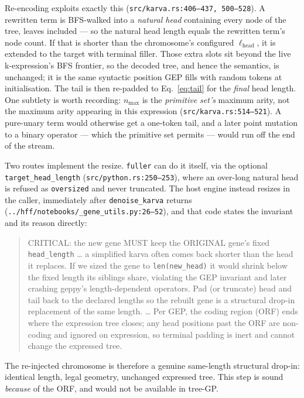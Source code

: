 \documentclass[sigconf]{acmart}
\begin{document}
Re-encoding exploits exactly this
(\texttt{src/karva.rs:406--437, 500--528}). A rewritten term is BFS-walked into a
\emph{natural head} containing every node of the tree, leaves included --- so the
natural head length equals the rewritten term's node count. If that is shorter
than the chromosome's configured $\ell_{\text{head}}$, it is extended to the
target with terminal filler. Those extra slots sit beyond the live
k-expression's BFS frontier, so the decoded tree, and hence the semantics, is
unchanged; it is the same syntactic position GEP fills with random tokens at
initialisation. The tail is then re-padded to Eq.~\ref{eq:tail} for the
\emph{final} head length. One subtlety is worth recording: $n_{\max}$ is the
\emph{primitive set's} maximum arity, not the maximum arity appearing in this
expression (\texttt{src/karva.rs:514--521}). A pure-unary term would otherwise get
a one-token tail, and a later point mutation to a binary operator --- which the
primitive set permits --- would run off the end of the stream.

Two routes implement the resize. \texttt{fuller} can do it itself, via the
optional \texttt{target\_head\_length} (\texttt{src/python.rs:250--253}), where an
over-long natural head is refused as \texttt{oversized} and never truncated. The
host engine instead resizes in the caller, immediately after
\texttt{denoise\_karva} returns
(\texttt{../hff/notebooks/\_gene\_utils.py:26--52}), and that code states the
invariant and its reason directly:

\begin{quote}\small
CRITICAL: the new gene MUST keep the ORIGINAL gene's fixed \texttt{head\_length}
\ldots{} a simplified karva often comes back shorter than the head it replaces. If
we sized the gene to \texttt{len(new\_head)} it would shrink below the fixed length
its siblings share, violating the GEP invariant and later crashing geppy's
length-dependent operators. Pad (or truncate) head and tail back to the declared
lengths so the rebuilt gene is a structural drop-in replacement of the same length.
\ldots{} Per GEP, the coding region (ORF) ends where the expression tree closes;
any head positions past the ORF are non-coding and ignored on expression, so
terminal padding is inert and cannot change the expressed tree.
\end{quote}

The re-injected chromosome is therefore a genuine same-length structural drop-in:
identical length, legal geometry, unchanged expressed tree. This step is sound
\emph{because} of the ORF, and would not be available in tree-GP.
\end{document}
